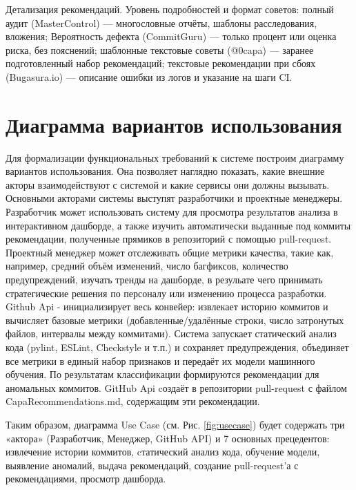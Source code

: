 Детализация рекомендаций. Уровень подробностей и формат советов: полный аудит (MasterControl) — многословные отчёты, шаблоны расследования, вложения; Вероятность дефекта (CommitGuru) — только процент или оценка риска, без пояснений; шаблонные текстовые советы (@0capa) — заранее подготовленный набор рекомендаций; текстовые рекомендации при сбоях (Bugasura.io) — описание ошибки из логов и указание на шаги CI.



\section{Диаграмма вариантов использования} \label{ch1:sec5}
Для формализации функциональных требований к системе построим диаграмму вариантов использования. Она позволяет наглядно показать, какие внешние акторы взаимодействуют с системой и какие сервисы они должны вызывать.
Основными акторами системы выступят разработчики и проектные менеджеры.
Разработчик может использовать систему для просмотра результатов анализа в интерактивном дашборде, а также изучить автоматически выданные под коммиты рекомендации, полученные прямиков в репозиторий с помощью pull-request.
Проектный менеджер может отслеживать общие метрики качества, такие как, например, средний объём изменений, число багфиксов, количество предупреждений, изучать тренды на дашборде, в резульате чего принимать стратегические решения по персоналу или изменению процесса разработки. Github Api - инициализирует весь конвейер: извлекает историю коммитов и вычисляет базовые метрики (добавленные/удалённые строки, число затронутых файлов, интервалы между коммитами). Система запускает статический анализ кода (pylint, ESLint, Checkstyle и т.п.) и сохраняет предупреждения, объединяет все метрики в единый набор признаков и передаёт их модели машинного обучения. По результатам классификации формируются рекомендации для аномальных коммитов. GitHub Api cоздаёт в репозитории pull-request с файлом CapaRecommendations.md, содержащим эти рекомендации.

Таким образом, диаграмма Use Case (см. Рис. \ref{fig:usecase}) будет содержать три «актора» (Разработчик, Менеджер, GitHub API) и 7 основных прецедентов: извлечение истории коммитов, cтатический анализ кода, обучение модели, выявление аномалий, выдача рекомендаций, создание pull-request’а с рекомендациями, просмотр дашборда.

